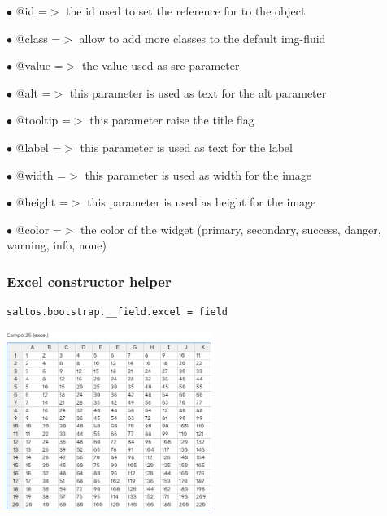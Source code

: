\documentclass[a4paper]{article}
\begin{document}
\begin{compactitem}
\item[\color{myblue}$\bullet$] @id      =$>$ the id used to set the reference for to the object
\item[\color{myblue}$\bullet$] @class   =$>$ allow to add more classes to the default img-fluid
\item[\color{myblue}$\bullet$] @value   =$>$ the value used as src parameter
\item[\color{myblue}$\bullet$] @alt     =$>$ this parameter is used as text for the alt parameter
\item[\color{myblue}$\bullet$] @tooltip =$>$ this parameter raise the title flag
\item[\color{myblue}$\bullet$] @label   =$>$ this parameter is used as text for the label
\item[\color{myblue}$\bullet$] @width   =$>$ this parameter is used as width for the image
\item[\color{myblue}$\bullet$] @height  =$>$ this parameter is used as height for the image
\item[\color{myblue}$\bullet$] @color   =$>$ the color of the widget (primary, secondary, success, danger, warning, info, none)
\end{compactitem}

\hypertarget{toc73}{}
\subsubsection{Excel constructor helper}

\begin{lstlisting}
saltos.bootstrap.__field.excel = field
\end{lstlisting}

\begin{center}\includegraphics[width=0.5\textwidth]{../ujest/snaps/test-bootstrap-js-bootstrap-campo-25-excel-1-snap.png}\end{center}
\end{document}
